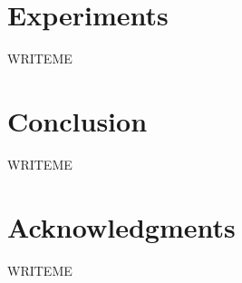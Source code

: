 \documentclass{article}
\renewcommand\[{\begin{equation}}
\renewcommand\]{\end{equation}}
\begin{document}
\section{Experiments}

WRITEME

\section{Conclusion}

WRITEME

\section*{Acknowledgments}

WRITEME



\end{document}
